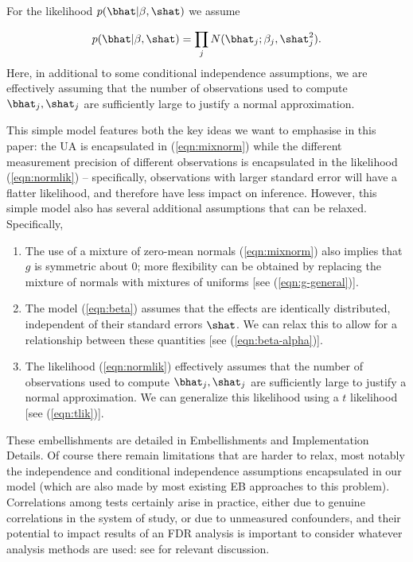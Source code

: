For the likelihood $p(\bhat | \beta, \shat)$ we assume

\begin{equation}
\label{eqn:normlik}
p(\bhat | \beta, \shat) = \prod_j N(\bhat_j; \beta_j, \shat_j^2).
\end{equation}
Here, in additional to some conditional independence assumptions, we are 
effectively  assuming that the number of observations used to compute $\bhat_j,\shat_j$ are sufficiently large to justify a normal approximation.

This simple model features both the key ideas we want to emphasise in this paper: the UA is encapsulated in (\ref{eqn:mixnorm}) while
the different measurement precision of different observations is encapsulated in the likelihood (\ref{eqn:normlik}) -- specifically, observations
with larger standard error will have a flatter likelihood, and therefore have less impact on inference.
However, this simple model also has several additional assumptions that can be relaxed. Specifically,

\begin{enumerate}
\item  The use of a mixture of zero-mean normals (\ref{eqn:mixnorm}) also implies that $g$ is symmetric about 0; more flexibility can be obtained by replacing the mixture of normals with mixtures of uniforms [see (\ref{eqn:g-general})].
\item The model (\ref{eqn:beta}) assumes that the effects are identically distributed, independent of their standard errors $\shat$.
We can relax this to allow for a relationship between these quantities [see (\ref{eqn:beta-alpha})].
\item The likelihood (\ref{eqn:normlik}) effectively assumes that the number of observations used to compute $\bhat_j,\shat_j$ are sufficiently large to justify a normal approximation. We can generalize this likelihood using a $t$ likelihood [see (\ref{eqn:tlik})].
\end{enumerate}
These embellishments are detailed in Embellishments and Implementation Details.
Of course there remain limitations that are harder to relax, most notably the independence and conditional independence assumptions encapsulated in our model
(which are also made by most existing EB approaches to this problem). Correlations among tests certainly arise in practice, either due to genuine correlations
in the system of study, or due to unmeasured confounders, and their potential to impact results of an FDR analysis is important to consider
whatever analysis methods are used: see \cite{efron2007correlation,leek:2007} for relevant discussion.

